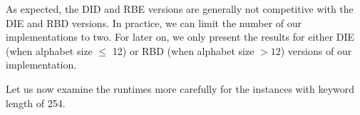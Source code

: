 \documentclass[english,twoside,censored,csm,algorithms-track-2020]{HYthesisML}
\theoremstyle{plain}
\theoremstyle{definition}
\begin{document}
As expected, the DID and RBE versions are generally not competitive with the DIE
and RBD versions. In practice, we can limit the number of our implementations to two.
For later on, we only present the results for either DIE (when alphabet size $\leq$ 12)
or RBD (when alphabet size $>12$) versions of our implementation.

Let us now examine the runtimes more carefully for the instances with keyword length of 254.


\begin{figure}
\begin{minipage}{.5\textwidth}
\end{minipage}
\end{figure}
\end{document}
